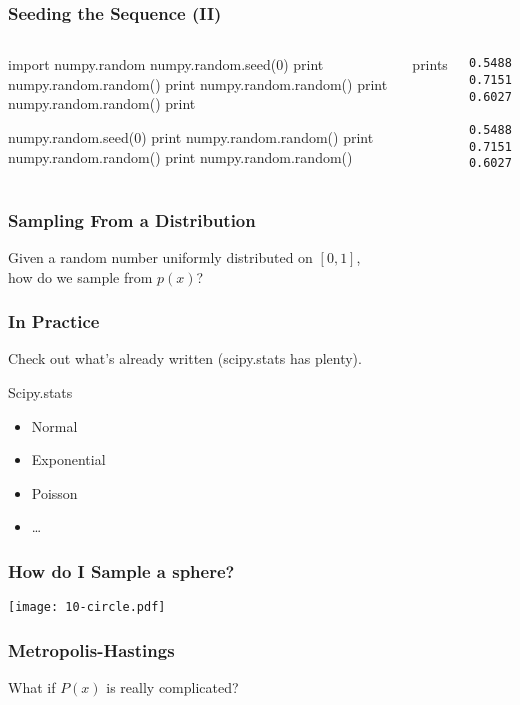 \begin{frame}[fragile]
\frametitle{Seeding the Sequence (II)}
\begin{columns}
\begin{python}
import numpy.random
numpy.random.seed(0)
print numpy.random.random()
print numpy.random.random()
print numpy.random.random()
print 

numpy.random.seed(0)
print numpy.random.random()
print numpy.random.random()
print numpy.random.random()
\end{python}
prints
\begin{verbatim}
0.548813503927
0.715189366372
0.602763376072

0.548813503927
0.715189366372
0.602763376072
\end{verbatim}

\end{columns}
\end{frame}

\begin{frame}[fragile]
\frametitle{Sampling From a Distribution}

Given a random number uniformly distributed on $[0,1]$,\\
how do we sample from $p(x)$?
\end{frame}

\begin{frame}[fragile]
\frametitle{In Practice}

Check out what's already written (scipy.stats has plenty).
\begin{block}{Scipy.stats}
\begin{itemize}
\item Normal
\item Exponential
\item Poisson
\item \ldots
\end{itemize}
\end{block}

\end{frame}

\begin{frame}[fragile]
\frametitle{How do I Sample a sphere?}

\texttt{[image: 10-circle.pdf]}

\end{frame}

\begin{frame}[fragile]
\frametitle{Metropolis-Hastings}
What if $P(x)$ is really complicated?
\end{frame}

